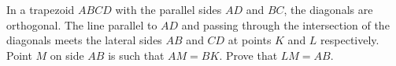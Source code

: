 \problem
In a trapezoid $ABCD$ with the parallel sides $AD$ and $BC$, the diagonals are
orthogonal.
The line parallel to $AD$ and passing through the intersection of the diagonals
meets the lateral sides $AB$ and $CD$ at points $K$ and $L$ respectively.
Point $M$ on side $AB$ is such that $AM = BK$.
Prove that $LM = AB$.
\solution
\endproblem
